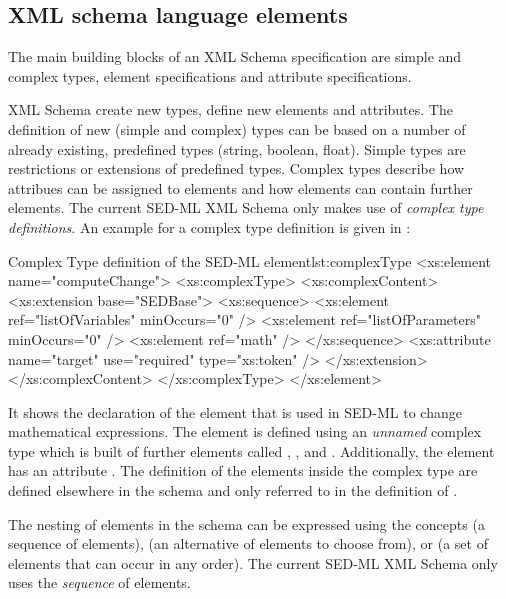 \subsection{XML schema language elements}
The main building blocks of an XML Schema specification are simple and complex types, element specifications and attribute specifications.

XML Schema  create new types,  define new elements and attributes.
The definition of new (simple and complex) types can be based on a number of already existing, predefined types (string, boolean, float). Simple types are restrictions or extensions of predefined types. Complex types describe how attribues can be assigned to elements and how elements can contain further elements. The current SED-ML XML Schema only makes use of \emph{complex type definitions}. An example for a complex type definition is given in :

\begin{myXmlLst}{Complex Type definition of the SED-ML  element}{lst:complexType}
<xs:element name="computeChange">
	<xs:complexType>
		<xs:complexContent>
			<xs:extension base="SEDBase">
				<xs:sequence>
					<xs:element ref="listOfVariables" minOccurs="0" />
					<xs:element ref="listOfParameters" minOccurs="0" />
					<xs:element ref="math" />
				</xs:sequence>
				<xs:attribute name="target" use="required" type="xs:token" />
			</xs:extension>
		</xs:complexContent>
	</xs:complexType>
</xs:element>
\end{myXmlLst}

It shows the declaration of the element  that is used in SED-ML to change mathematical expressions. The element is defined using an \emph{unnamed} complex type which is built of further elements called , , and . Additionally, the element  has an attribute . The definition of the elements inside the complex type are defined elsewhere in the schema and only referred to in the definition of .

The nesting of elements in the schema can be expressed using the concepts  (a sequence of elements),  (an alternative of elements to choose from), or  (a set of elements that can occur in any order). The current SED-ML XML Schema only uses the \emph{sequence} of elements. 


